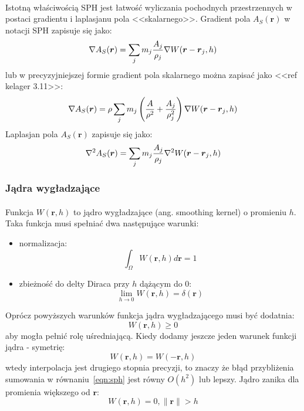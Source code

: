 \paragraph{}
Istotną właściwością SPH jest łatwość wyliczania pochodnych przestrzennych w postaci gradientu i laplasjanu pola <<skalarnego>>. Gradient pola $A_S(\boldsymbol{r})$ w notacji SPH zapisuje się jako:
\begin{equation}
\nabla A_S(\boldsymbol{r}) = \sum\limits_{j} m_j {A_j \over\rho_j} \nabla W(\boldsymbol{r}-\boldsymbol{r}_j, h)
\label{eqn:sph_grad}
\end{equation}
lub w precyzyjniejszej formie gradient pola skalarnego można zapisać jako <<ref kelager 3.11>>:
\begin{equation}
\nabla A_S(\boldsymbol{r}) = \rho \sum\limits_{j} m_j \left( {A \over \rho^2} + {A_j \over \rho_j^2} \right) \nabla W(\boldsymbol{r}-\boldsymbol{r}_j, h)
\label{eqn:sph_grad_prec}
\end{equation}
Laplasjan pola $A_S(\boldsymbol{r})$ zapisuje się jako:
\begin{equation}
\nabla^2 A_S(\boldsymbol{r}) = \sum\limits_{j} m_j {A_j \over\rho_j} \nabla^2 W(\boldsymbol{r}-\boldsymbol{r}_j, h)
\label{eqn:sph_lap}
\end{equation}
\par

\subsubsection{Jądra wygładzające}

\paragraph{}
Funkcja $W(\boldsymbol{r}, h)$ to jądro wygładzające (ang. smoothing kernel) o promieniu $h$. Taka funkcja musi spełniać dwa następujące warunki:
\begin{itemize}
\item normalizacja: $$\int_{\Omega} W(\boldsymbol{r}, h) d\boldsymbol{r} = 1$$
\item zbieżność do delty Diraca przy $h$ dążącym do 0: $$\lim_{h\to0} W(\boldsymbol{r}, h) = \delta(\boldsymbol{r})$$
\end{itemize}
\vspace{3ex}
\noindent
Oprócz powyższych warunków funkcja jądra wygładzającego musi być dodatnia: $$W(\boldsymbol{r}, h) \ge 0$$ aby mogła pełnić rolę uśredniającą. Kiedy dodamy jeszcze jeden warunek funkcji jądra - symetrię: $$W(\boldsymbol{r}, h) = W(\boldsymbol{-r}, h)$$ wtedy interpolacja jest drugiego stopnia precyzji, to znaczy że błąd przybliżenia sumowania w równaniu~\eqref{eqn:sph} jest równy $O(h^{2})$ lub lepszy. Jądro zanika dla promienia większego od $\boldsymbol{r}$: $$W(\boldsymbol{r}, h) = 0, \| \mathbf{r} \| > h$$
\par

